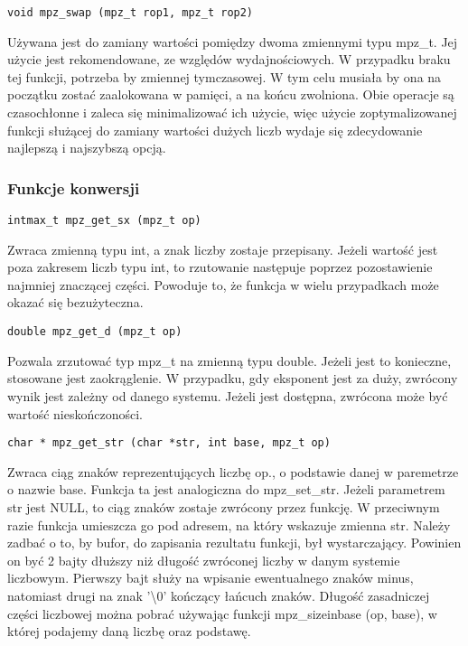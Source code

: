 \documentclass[twoside,a4paper]{book}
\begin{document}
\begin{lstlisting}
void mpz_swap (mpz_t rop1, mpz_t rop2)
\end{lstlisting}

Używana jest do zamiany wartości pomiędzy dwoma zmiennymi typu mpz\_t. Jej użycie jest rekomendowane, ze względów wydajnościowych. W przypadku braku tej funkcji, potrzeba by zmiennej tymczasowej. W tym celu musiała by ona na początku zostać zaalokowana w pamięci, a na końcu zwolniona. Obie operacje są czasochłonne i zaleca się minimalizować ich użycie, więc użycie zoptymalizowanej funkcji służącej do zamiany wartości dużych liczb wydaje się zdecydowanie najlepszą i najszybszą opcją.

\subsubsection{Funkcje konwersji}

\begin{lstlisting}
intmax_t mpz_get_sx (mpz_t op)
\end{lstlisting}

Zwraca zmienną typu int, a znak liczby zostaje przepisany. Jeżeli wartość jest poza zakresem liczb typu int, to rzutowanie następuje poprzez pozostawienie najmniej znaczącej części. Powoduje to, że funkcja w wielu przypadkach może okazać się bezużyteczna.

\begin{lstlisting}
double mpz_get_d (mpz_t op)
\end{lstlisting}

Pozwala zrzutować typ mpz\_t na zmienną typu double. Jeżeli jest to konieczne, stosowane jest zaokrąglenie. W przypadku, gdy eksponent jest za duży, zwrócony wynik jest zależny od danego systemu. Jeżeli jest dostępna, zwrócona może być wartość nieskończoności.

\begin{lstlisting}
char * mpz_get_str (char *str, int base, mpz_t op)
\end{lstlisting}

Zwraca ciąg znaków reprezentujących liczbę op., o podstawie danej w paremetrze o nazwie base. Funkcja ta jest analogiczna do mpz\_set\_str. Jeżeli parametrem str jest NULL, to ciąg znaków zostaje zwrócony przez funkcję. W przeciwnym razie funkcja umieszcza go pod adresem, na który wskazuje zmienna str. Należy zadbać o to, by bufor, do zapisania rezultatu funkcji, był wystarczający. Powinien on być 2 bajty dłuższy niż długość zwróconej liczby w danym systemie liczbowym. Pierwszy bajt służy na wpisanie ewentualnego znaków minus, natomiast drugi na znak '\textbackslash0' kończący łańcuch znaków. Długość zasadniczej części liczbowej można pobrać używając funkcji mpz\_sizeinbase (op, base), w której podajemy daną liczbę oraz podstawę.
\end{document}
